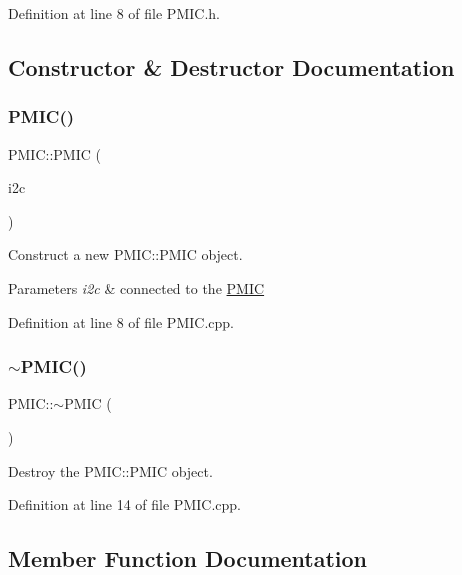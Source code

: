 Definition at line 8 of file P\+M\+I\+C.\+h.



\subsection{Constructor \& Destructor Documentation}
\mbox{\label{class_p_m_i_c_ab687d3b9ff14729e6ea439fd246f542f}} 
\subsubsection{\texorpdfstring{PMIC()}{PMIC()}}
{\footnotesize\ttfamily P\+M\+I\+C\+::\+P\+M\+IC (\begin{DoxyParamCaption}\item[{I2C \&}]{i2c }\end{DoxyParamCaption})}



Construct a new P\+M\+I\+C\+::\+P\+M\+IC object. 


\begin{DoxyParams}{Parameters}
{\em i2c} & connected to the \mbox{\hyperlink{class_p_m_i_c}{P\+M\+IC}} \\
\hline
\end{DoxyParams}


Definition at line 8 of file P\+M\+I\+C.\+cpp.

\mbox{\label{class_p_m_i_c_a68ddf66e3dab8a38dac9f026cfbb2b30}} 
\subsubsection{\texorpdfstring{$\sim$PMIC()}{~PMIC()}}
{\footnotesize\ttfamily P\+M\+I\+C\+::$\sim$\+P\+M\+IC (\begin{DoxyParamCaption}{ }\end{DoxyParamCaption})}



Destroy the P\+M\+I\+C\+::\+P\+M\+IC object. 



Definition at line 14 of file P\+M\+I\+C.\+cpp.



\subsection{Member Function Documentation}
\mbox{\label{class_p_m_i_c_ae899cdd3d66ecef345c748f9c42b5399}} 
